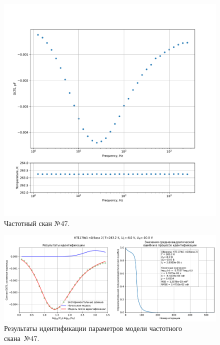\begin{figure}[!ht]
    \centering
    \includegraphics[width=1\textwidth]{../plots/КТ117№1_п1(база 2)_2500Гц-1Гц_1пФ_-10С_-6В-10В_100мВ_20мкс_шаг_0,1.pdf}
    \caption{Частотный скан №47.}
    \label{pic:frequency_scan_47}
\end{figure}

\begin{figure}[!ht]
    \centering
    \includegraphics[width=1\textwidth]{../plots/КТ117№1_п1(база 2)_2500Гц-1Гц_1пФ_-10С_-6В-10В_100мВ_20мкс_шаг_0,1_model.pdf}
    \caption{Результаты идентификации параметров модели частотного скана~№47.}
    \label{pic:frequency_scan_model47}
\end{figure}

\pagebreak


